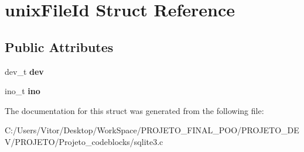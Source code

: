 \hypertarget{structunix_file_id}{\section{unix\-File\-Id Struct Reference}
\label{structunix_file_id}
}
\subsection*{Public Attributes}
\begin{DoxyCompactItemize}
\item 
\hypertarget{structunix_file_id_acf703d95b9a1ae2f34affb7e9ae45e1b}{dev\-\_\-t {\bfseries dev}}\label{structunix_file_id_acf703d95b9a1ae2f34affb7e9ae45e1b}

\item 
\hypertarget{structunix_file_id_a2cc2d43e9d3f0a60810daa8fc353e692}{ino\-\_\-t {\bfseries ino}}\label{structunix_file_id_a2cc2d43e9d3f0a60810daa8fc353e692}

\end{DoxyCompactItemize}


The documentation for this struct was generated from the following file\-:\begin{DoxyCompactItemize}
\item 
C\-:/\-Users/\-Vitor/\-Desktop/\-Work\-Space/\-P\-R\-O\-J\-E\-T\-O\-\_\-\-F\-I\-N\-A\-L\-\_\-\-P\-O\-O/\-P\-R\-O\-J\-E\-T\-O\-\_\-\-D\-E\-V/\-P\-R\-O\-J\-E\-T\-O/\-Projeto\-\_\-codeblocks/sqlite3.\-c\end{DoxyCompactItemize}
